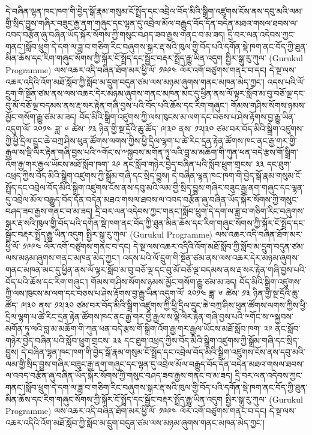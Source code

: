\documentclass{article}
\begin{document}
དེ་བཞིན་ལྷན་ཁང་ཁག་གི་བྱེད་སྒོ་རྣམ་གསུམ་ངོ་སྤྲོད་དང་འབྲེལ་བོད་མིའི་སྒྲིག་འཛུགས་ངོས་ནས་དབུ་མའི་ལམ་གྱི་སྲིད་བྱུས་གཞིར་བཟུང་རྒྱ་ནག་གཞུང་དང་ལྷན་དུ་འབྲེལ་མོལ་བརྒྱུད་བོད་དོན་བདེན་མཐའ་གསལ་ཐབས་ལ་འབད་བརྩོན་ཞུ་བཞིན་ཡོད་སྐོར་སོགས་ཀྱི་གསུང་བཤད་ཟབ་རྒྱས་གནང་བ་མ་ཟད། དྲི་བར་ལན་འདེབས་ཀྱང་གནང་།སློབ་ཕྲུག་དེ་དག་ལ་ཟླ་བ་གཅིག་རིང་བཞུགས་སྒར་རྡ་སའི་ཁུལ་གྱི་བོད་པའི་དགོན་སྡེ་ཁག་ནང་བོད་ཀྱི་ཐུན་མིན་ཆོས་དང་རིག་གཞུང་སོགས་ཀྱི་སྐོར་ངོ་སྤྲོད་དང་སྦྱོང་བརྡར་སྤྲོད་རྒྱུ་ཡིན་འདུག སྤྱིར་སྒུ་རུ་ཀུལ་ (Gurukul Programme) ལས་འཆར་འདི་བཞིན་ཐོག་མར་ཕྱི་ལོ་ ༡༩༩༤ ལོར་འགོ་བཙུགས་གནང་བ་དང། དེ་སྔ་ལས་འཆར་འདིའི་འོག་མཐོ་སློབ་ཀྱི་སློབ་མ་དྲུག་བདུན་ཙམ་ལས་མཉམ་ཞུགས་གནང་མཁན་མེད་ཀྱང་། འདས་པའི་ལོ་དྲུག་གི་སྔོན་ཙམ་ནས་ལས་འཆར་དེར་མཉམ་ཞུགས་གནང་མཁན་མང་དུ་ཕྱིན་ནས་ལོ་ལྟར་སློབ་མ་བུ་བཅོ་ལྔ་དང་བུ་མོ་བཅོ་ལྔ་བདམས་ནས་རྡ་སར་རྟེན་གཞི་བྱས་པའི་བོད་པའི་ཆོས་དང་རིག་གཞུང་། གོམས་གཤིས་སོགས་ཉམས་མྱོང་གསོག་རྒྱུ་ཙམ་མ་ཟད། བོད་མིའི་སྒྲིག་འཛུགས་ཀྱི་ལས་ཁུངས་མ་ལག་དང་བཅས་པ་ཤེས་རྟོགས་བྱ་རྒྱུ་ཡིན་འདུག་ལོ་ ༢༠༡༤ ཟླ་ ༦ ཚེས་ ༡༣ ཉིན་གྱི་སྔ་དྲོའི་ཆུ་ཚོད་ ༩།༣༠ ནས་ ༡༢།༣༠ ཙམ་བར་བོད་མིའི་སྒྲིག་འཛུགས་ཀྱི་ཕྱི་དྲིལ་དྲུང་ཆེ་བཀྲ་ཤིས་ཕུན་ཚོགས་ལགས་ཀྱིས་ཕྱི་དྲིལ་ལྷག་པ་ཚེ་རིང་དྲན་རྟེན་ཚོགས་ཁང་ནང་རྒྱ་གར་གྱི་རྒྱལ་ས་ལྡི་ལིར་རྟེན་གཞི་བྱས་པའི་༸གོང་ས་༸སྐྱབས་མགོན་ཏཱ་ལའི་བླ་མ་མཆོག་གི་ཀུན་ཕན་བདེ་རྩས་གོ་སྒྲིག་འོག་རྒྱ་གར་རྒྱལ་ཡོངས་མཐོ་སློབ་ཁག་ ༢༩ ནང་སློབ་གཉེར་བྱེད་བཞིན་པའི་སློབ་ཕྲུག་གྲངས་ ༣༣ དང་ཐུག་འཕྲད་ཀྱིས་བོད་མིའི་སྒྲིག་འཛུགས་ཀྱི་སྒྲོམ་གཞི་དང་སྲིད་བྱུས། དེ་བཞིན་ལྷན་ཁང་ཁག་གི་བྱེད་སྒོ་རྣམ་གསུམ་ངོ་སྤྲོད་དང་འབྲེལ་བོད་མིའི་སྒྲིག་འཛུགས་ངོས་ནས་དབུ་མའི་ལམ་གྱི་སྲིད་བྱུས་གཞིར་བཟུང་རྒྱ་ནག་གཞུང་དང་ལྷན་དུ་འབྲེལ་མོལ་བརྒྱུད་བོད་དོན་བདེན་མཐའ་གསལ་ཐབས་ལ་འབད་བརྩོན་ཞུ་བཞིན་ཡོད་སྐོར་སོགས་ཀྱི་གསུང་བཤད་ཟབ་རྒྱས་གནང་བ་མ་ཟད། དྲི་བར་ལན་འདེབས་ཀྱང་གནང་།སློབ་ཕྲུག་དེ་དག་ལ་ཟླ་བ་གཅིག་རིང་བཞུགས་སྒར་རྡ་སའི་ཁུལ་གྱི་བོད་པའི་དགོན་སྡེ་ཁག་ནང་བོད་ཀྱི་ཐུན་མིན་ཆོས་དང་རིག་གཞུང་སོགས་ཀྱི་སྐོར་ངོ་སྤྲོད་དང་སྦྱོང་བརྡར་སྤྲོད་རྒྱུ་ཡིན་འདུག སྤྱིར་སྒུ་རུ་ཀུལ་ (Gurukul Programme) ལས་འཆར་འདི་བཞིན་ཐོག་མར་ཕྱི་ལོ་ ༡༩༩༤ ལོར་འགོ་བཙུགས་གནང་བ་དང། དེ་སྔ་ལས་འཆར་འདིའི་འོག་མཐོ་སློབ་ཀྱི་སློབ་མ་དྲུག་བདུན་ཙམ་ལས་མཉམ་ཞུགས་གནང་མཁན་མེད་ཀྱང་། འདས་པའི་ལོ་དྲུག་གི་སྔོན་ཙམ་ནས་ལས་འཆར་དེར་མཉམ་ཞུགས་གནང་མཁན་མང་དུ་ཕྱིན་ནས་ལོ་ལྟར་སློབ་མ་བུ་བཅོ་ལྔ་དང་བུ་མོ་བཅོ་ལྔ་བདམས་ནས་རྡ་སར་རྟེན་གཞི་བྱས་པའི་བོད་པའི་ཆོས་དང་རིག་གཞུང་། གོམས་གཤིས་སོགས་ཉམས་མྱོང་གསོག་རྒྱུ་ཙམ་མ་ཟད། བོད་མིའི་སྒྲིག་འཛུགས་ཀྱི་ལས་ཁུངས་མ་ལག་དང་བཅས་པ་ཤེས་རྟོགས་བྱ་རྒྱུ་ཡིན་འདུག་ལོ་ ༢༠༡༤ ཟླ་ ༦ ཚེས་ ༡༣ ཉིན་གྱི་སྔ་དྲོའི་ཆུ་ཚོད་ ༩།༣༠ ནས་ ༡༢།༣༠ ཙམ་བར་བོད་མིའི་སྒྲིག་འཛུགས་ཀྱི་ཕྱི་དྲིལ་དྲུང་ཆེ་བཀྲ་ཤིས་ཕུན་ཚོགས་ལགས་ཀྱིས་ཕྱི་དྲིལ་ལྷག་པ་ཚེ་རིང་དྲན་རྟེན་ཚོགས་ཁང་ནང་རྒྱ་གར་གྱི་རྒྱལ་ས་ལྡི་ལིར་རྟེན་གཞི་བྱས་པའི་༸གོང་ས་༸སྐྱབས་མགོན་ཏཱ་ལའི་བླ་མ་མཆོག་གི་ཀུན་ཕན་བདེ་རྩས་གོ་སྒྲིག་འོག་རྒྱ་གར་རྒྱལ་ཡོངས་མཐོ་སློབ་ཁག་ ༢༩ ནང་སློབ་གཉེར་བྱེད་བཞིན་པའི་སློབ་ཕྲུག་གྲངས་ ༣༣ དང་ཐུག་འཕྲད་ཀྱིས་བོད་མིའི་སྒྲིག་འཛུགས་ཀྱི་སྒྲོམ་གཞི་དང་སྲིད་བྱུས། དེ་བཞིན་ལྷན་ཁང་ཁག་གི་བྱེད་སྒོ་རྣམ་གསུམ་ངོ་སྤྲོད་དང་འབྲེལ་བོད་མིའི་སྒྲིག་འཛུགས་ངོས་ནས་དབུ་མའི་ལམ་གྱི་སྲིད་བྱུས་གཞིར་བཟུང་རྒྱ་ནག་གཞུང་དང་ལྷན་དུ་འབྲེལ་མོལ་བརྒྱུད་བོད་དོན་བདེན་མཐའ་གསལ་ཐབས་ལ་འབད་བརྩོན་ཞུ་བཞིན་ཡོད་སྐོར་སོགས་ཀྱི་གསུང་བཤད་ཟབ་རྒྱས་གནང་བ་མ་ཟད། དྲི་བར་ལན་འདེབས་ཀྱང་གནང་།སློབ་ཕྲུག་དེ་དག་ལ་ཟླ་བ་གཅིག་རིང་བཞུགས་སྒར་རྡ་སའི་ཁུལ་གྱི་བོད་པའི་དགོན་སྡེ་ཁག་ནང་བོད་ཀྱི་ཐུན་མིན་ཆོས་དང་རིག་གཞུང་སོགས་ཀྱི་སྐོར་ངོ་སྤྲོད་དང་སྦྱོང་བརྡར་སྤྲོད་རྒྱུ་ཡིན་འདུག སྤྱིར་སྒུ་རུ་ཀུལ་ (Gurukul Programme) ལས་འཆར་འདི་བཞིན་ཐོག་མར་ཕྱི་ལོ་ ༡༩༩༤ ལོར་འགོ་བཙུགས་གནང་བ་དང། དེ་སྔ་ལས་འཆར་འདིའི་འོག་མཐོ་སློབ་ཀྱི་སློབ་མ་དྲུག་བདུན་ཙམ་ལས་མཉམ་ཞུགས་གནང་མཁན་མེད་ཀྱང་། 
\end{document}
